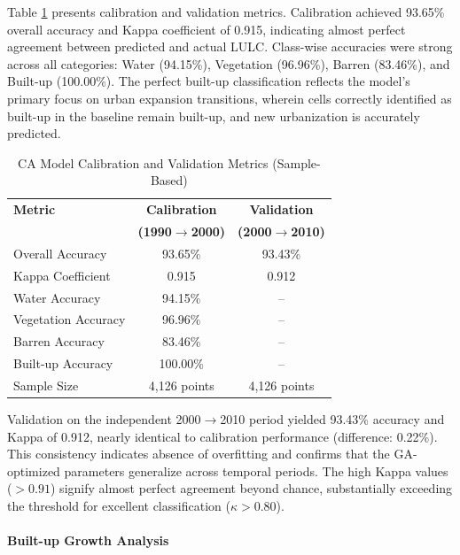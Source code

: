 \documentclass[conference]{IEEEtran}
\begin{document}
Table \ref{tab:ca_calibration} presents calibration and validation metrics. Calibration achieved 93.65\% overall accuracy and Kappa coefficient of 0.915, indicating almost perfect agreement between predicted and actual LULC. Class-wise accuracies were strong across all categories: Water (94.15\%), Vegetation (96.96\%), Barren (83.46\%), and Built-up (100.00\%). The perfect built-up classification reflects the model's primary focus on urban expansion transitions, wherein cells correctly identified as built-up in the baseline remain built-up, and new urbanization is accurately predicted.

\begin{table}[!t]
\caption{CA Model Calibration and Validation Metrics (Sample-Based)}
\label{tab:ca_calibration}
\centering
\small
\renewcommand{\arraystretch}{1.2}
\begin{tabular}{lcc}
\toprule
\textbf{Metric} & \textbf{Calibration} & \textbf{Validation} \\
 & \textbf{(1990$\rightarrow$2000)} & \textbf{(2000$\rightarrow$2010)} \\
\midrule
Overall Accuracy & 93.65\% & 93.43\% \\
Kappa Coefficient & 0.915 & 0.912 \\
Water Accuracy & 94.15\% & -- \\
Vegetation Accuracy & 96.96\% & -- \\
Barren Accuracy & 83.46\% & -- \\
Built-up Accuracy & 100.00\% & -- \\
\midrule
Sample Size & 4,126 points & 4,126 points \\
\bottomrule
\end{tabular}
\end{table}

Validation on the independent 2000$\rightarrow$2010 period yielded 93.43\% accuracy and Kappa of 0.912, nearly identical to calibration performance (difference: 0.22\%). This consistency indicates absence of overfitting and confirms that the GA-optimized parameters generalize across temporal periods. The high Kappa values ($>0.91$) signify almost perfect agreement beyond chance, substantially exceeding the threshold for excellent classification ($\kappa > 0.80$).

\paragraph{Built-up Growth Analysis}
\end{document}

